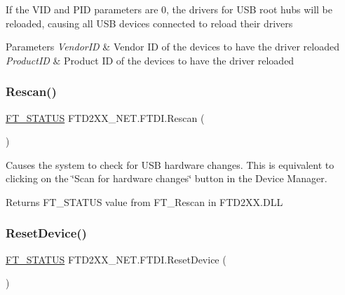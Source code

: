 If the V\+ID and P\+ID parameters are 0, the drivers for U\+SB root hubs will be reloaded, causing all U\+SB devices connected to reload their drivers


\begin{DoxyParams}{Parameters}
{\em Vendor\+ID} & Vendor ID of the devices to have the driver reloaded\\
\hline
{\em Product\+ID} & Product ID of the devices to have the driver reloaded\\
\hline
\end{DoxyParams}
\mbox{\label{class_f_t_d2_x_x___n_e_t_1_1_f_t_d_i_a939a869f6586eab80fff376bb857544b}} 
\subsubsection{\texorpdfstring{Rescan()}{Rescan()}}
{\footnotesize\ttfamily \mbox{\hyperlink{class_f_t_d2_x_x___n_e_t_1_1_f_t_d_i_aabe20ad905cc4ccc1e35dd5b877d9a83}{F\+T\+\_\+\+S\+T\+A\+T\+US}} F\+T\+D2\+X\+X\+\_\+\+N\+E\+T.\+F\+T\+D\+I.\+Rescan (\begin{DoxyParamCaption}{ }\end{DoxyParamCaption})}



Causes the system to check for U\+SB hardware changes. This is equivalent to clicking on the \char`\"{}\+Scan for hardware changes\char`\"{} button in the Device Manager. 

\begin{DoxyReturn}{Returns}
F\+T\+\_\+\+S\+T\+A\+T\+US value from F\+T\+\_\+\+Rescan in F\+T\+D2\+X\+X.\+D\+LL
\end{DoxyReturn}
\mbox{\label{class_f_t_d2_x_x___n_e_t_1_1_f_t_d_i_a13cf6c0edaf5e92375c962203c1b27b9}} 
\subsubsection{\texorpdfstring{ResetDevice()}{ResetDevice()}}
{\footnotesize\ttfamily \mbox{\hyperlink{class_f_t_d2_x_x___n_e_t_1_1_f_t_d_i_aabe20ad905cc4ccc1e35dd5b877d9a83}{F\+T\+\_\+\+S\+T\+A\+T\+US}} F\+T\+D2\+X\+X\+\_\+\+N\+E\+T.\+F\+T\+D\+I.\+Reset\+Device (\begin{DoxyParamCaption}{ }\end{DoxyParamCaption})}



